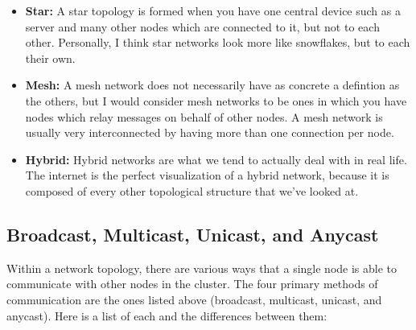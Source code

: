 \documentclass{article}
\begin{document}
\begin{itemize}
\item{%
    \textbf{Star:} A star topology is formed when you have one central device such as a server and many other
    nodes which are connected to it, but not to each other. Personally, I think star networks look more like
    snowflakes, but to each their own.
}

\item{%
    \textbf{Mesh:} A mesh network does not necessarily have as concrete a defintion as the others, but I would
    consider mesh networks to be ones in which you have nodes which relay messages on behalf of other nodes.
    A mesh network is usually very interconnected by having more than one connection per node.
}

\item{%
    \textbf{Hybrid:} Hybrid networks are what we tend to actually deal with in real life. The internet is the
    perfect visualization of a hybrid network, because it is composed of every other topological structure that
    we've looked at.
}

\end{itemize}

\subsection{Broadcast, Multicast, Unicast, and Anycast}

Within a network topology, there are various ways that a single node is able to communicate with other nodes
in the cluster. The four primary methods of communication are the ones listed above (broadcast, multicast,
unicast, and anycast). Here is a list of each and the differences between them:
\end{document}
